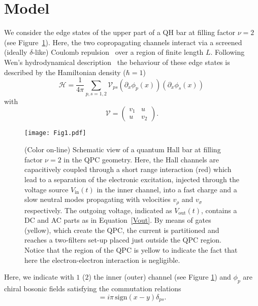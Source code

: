 \documentclass[12pt]{iopart}
\begin{document}

\section{\label{sec:model} Model}
We consider the edge states of the upper part of a QH bar at filling factor $\nu=2$ (see Figure~\ref{Fig1}). Here, the two copropagating channels interact via a screened (ideally $\delta$-like) Coulomb repulsion~\cite{ Wahl14, Ferraro14, Levkivskyi08, Rebora20, Sukhorukov07, Degiovanni10, Ferraro17, Acciai18} over a region of finite length $L$. Following Wen's hydrodynamical description~\cite{Wen95} the behaviour of these edge states is described by the Hamiltonian density ($\hbar=1$)
\begin{equation}
    \mathcal{H}=\frac{1}{4 \pi} \sum_{p,s=1,2}\mathcal{V}_{ps}\left( \partial_x\phi_{p}(x)\right)\left( \partial_x\phi_{s}(x)\right)\, \label{eq:0}
\end{equation}
with 
\begin{equation}
  \mathcal{V}=\begin{pmatrix}
    v_{1}  & u \\
    u & v_{2}
    \end{pmatrix}.
    \label{eq:v}
\end{equation}
\begin{figure}[ht]
\centering
\texttt{[image: Fig1.pdf]}
\caption{(Color on-line) Schematic view of a quantum Hall bar at filling factor $\nu=2$ in the QPC geometry. Here, the Hall channels are capacitively coupled through a short range interaction (red) which lead to a separation of the electronic excitation, injected through the voltage source $V_{\mathrm{in}}(t)$ in the inner channel, into a fast charge and a slow neutral modes propagating with velocities $v_\rho$ and $v_\sigma$ respectively. The outgoing voltage, indicated as $V_{\mathrm{out}}(t)$, contains a DC and AC parts as in Equation~\eqref{Vout}. By means of gates (yellow), which create the QPC, the current is partitioned and reaches a two-filters set-up placed just outside the QPC region. Notice that the region of the QPC is yellow to indicate the fact that here the electron-electron interaction is negligible.} 
\label{Fig1}
\end{figure}  
Here, we indicate with $1$ ($2$) the inner (outer) channel (see Figure \ref{Fig1}) and $\phi_{p}$ are chiral bosonic fields satisfying the commutation relations
\begin{equation}
[\phi_p(x),\phi_s(y)]=i \pi \,\mathrm{sign}(x-y) \delta_{ps}.
\end{equation} 
\end{document}
